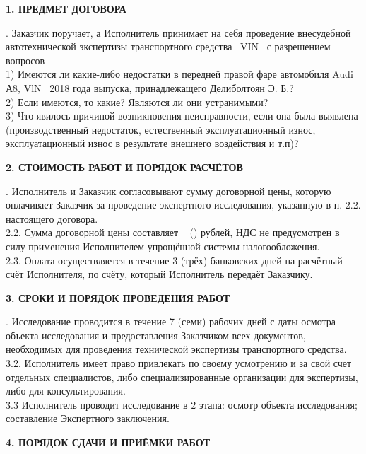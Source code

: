 \begin{center}
	\textbf{1. ПРЕДМЕТ ДОГОВОРА}
\end{center}
\vspace{-2mm}
 . Заказчик поручает, а Исполнитель принимает на себя проведение внесудебной автотехнической экспертизы  транспортного средства  \, VIN \vin\,  с разрешением вопросов\\
 1) Имеются ли какие-либо недостатки в передней правой фаре
 автомобиля Audi А8, VlN  \vin\, 2018 года выпуска,
 принадлежащего Делиболтоян Э. Б.?\\
 2) Если имеются, то какие? Являются ли они устранимыми?\\
 3) Что явилось причиной возникновения неисправности, если она была  выявлена  (производственный недостаток, естественный  эксплуатационный износ, эксплуатационный износ в результате  внешнего воздействия и т.п)?
\begin{center}
	\textbf{2. СТОИМОСТЬ РАБОТ И ПОРЯДОК РАСЧЁТОВ}
\end{center}
\vspace{-2mm}
. Исполнитель и Заказчик согласовывают сумму договорной цены, которую оплачивает Заказчик   за проведение экспертного исследования, указанную в п. 2.2. настоящего договора.\\ 
2.2. Сумма договорной цены составляет  ~ (\!\!) рублей, НДС не предусмотрен в силу применения Исполнителем упрощённой системы налогообложения.\\
2.3. Оплата осуществляется в течение 3 (трёх) банковских дней на расчётный счёт Исполнителя, по счёту, который Исполнитель передаёт Заказчику.
\begin{center}
	\textbf{3. СРОКИ И ПОРЯДОК ПРОВЕДЕНИЯ РАБОТ}
\end{center}
\vspace{-2mm}
. Исследование проводится в течение 7 (семи) рабочих дней с даты  осмотра объекта исследования и предоставления Заказчиком всех документов,
необходимых для проведения  технической экспертизы транспортного средства.\\
3.2. Исполнитель имеет право привлекать по своему усмотрению и за свой счет отдельных 
специалистов, либо специализированные организации для экспертизы, либо для консультирования.\\
3.3 Исполнитель проводит исследование в 2 этапа: осмотр  объекта исследования; составление Экспертного заключения.
\begin{center}
	\textbf{4. ПОРЯДОК СДАЧИ И ПРИЁМКИ РАБОТ}
\end{center}
